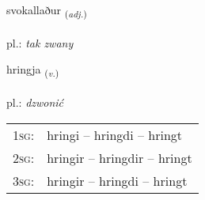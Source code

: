 \documentclass[frontgrid, backgrid]{flacards}\usepackage[]{graphicx}\usepackage[]{xcolor}
\begin{document}
\renewcommand{\flhead}{\vskip5pt \fboxsep=0pt {\small\bfseries\footnotesize Lýsingarorð | przymiotnik}}
\renewcommand{\fcfoot}{\vskip5pt \fboxsep=0pt \hspace{2pt}{\small\bfseries\footnotesize 1K}}

\renewcommand{\blhead}{\vskip5pt {\small\bfseries\footnotesize Lýsingarorð | przymiotnik }}
\renewcommand{\bcfoot}{\vskip5pt \hspace{2pt}{\small\bfseries\footnotesize 1K}}


{svokallaður \small{\textsubscript{(\textit{adj.})}} \\[1ex] %
\textphonetic{[svɔːkʰatlaðʏr]} \\
pl.: \emph{tak zwany} \\  [2ex]
\renewcommand*{\arraystretch}{0.8}
}

\renewcommand{\flhead}{\vskip5pt \fboxsep=0pt {\small\bfseries\footnotesize Sagnorð | czasownik}}
\renewcommand{\fcfoot}{\vskip5pt \fboxsep=0pt \hspace{2pt}{\small\bfseries\footnotesize 1K}}

\renewcommand{\blhead}{\vskip5pt {\small\bfseries\footnotesize Sagnorð | czasownik }}
\renewcommand{\bcfoot}{\vskip5pt \hspace{2pt}{\small\bfseries\footnotesize 1K}}


{hringja \small{\textsubscript{(\textit{v.})}} \\[1ex] %
\textphonetic{[r̥iɲca]} \\
pl.: \emph{dzwonić} \\  [2ex]
\renewcommand*{\arraystretch}{0.8}
\begin{tabular}{p{1cm}l}
\textsc{1sg}: & hringi -- hringdi -- hringt \\ 
\textsc{2sg}: & hringir -- hringdir -- hringt \\ 
\textsc{3sg}: & hringir -- hringdi -- hringt \\ 
\end{tabular}
}
\end{document}
